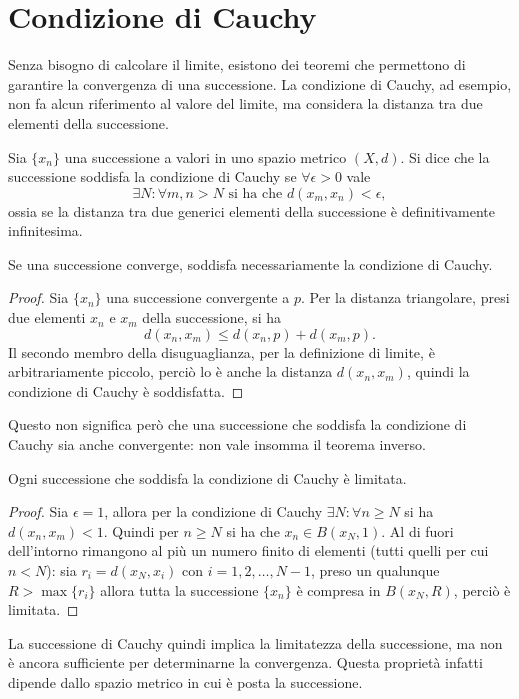 \section{Condizione di Cauchy}
Senza bisogno di calcolare il limite, esistono dei teoremi che permettono di garantire la convergenza di una successione. La condizione di Cauchy, ad esempio, non fa alcun riferimento al valore del limite, ma considera la distanza tra due elementi della successione.
\begin{definizione}
\label{d:ccauchy_successioni}
Sia $\{x_n\}$ una successione a valori in uno spazio metrico $(X,d)$. Si dice che la successione soddisfa la condizione di Cauchy se $\forall\epsilon>0$ vale
\begin{equation}
\label{eq:ccauchy_successioni}
\exists N\colon\forall m,n>N\text{ si ha che }d(x_m,x_n)<\epsilon,
\end{equation}
ossia se la distanza tra due generici elementi della successione è definitivamente infinitesima.
\end{definizione}
\begin{osservazione}
Se una successione converge, soddisfa necessariamente la condizione di Cauchy.
\end{osservazione}
\begin{proof}
Sia $\{x_n\}$ una successione convergente a $p$. Per la distanza triangolare, presi due elementi $x_n$ e $x_m$ della successione, si ha
\[
d(x_n,x_m)\leq d(x_n,p)+d(x_m,p).
\]
Il secondo membro della disuguaglianza, per la definizione di limite, è arbitrariamente piccolo, perciò lo è anche la distanza $d(x_n,x_m)$, quindi la condizione di Cauchy è soddisfatta.
\end{proof}
Questo non significa però che una successione che soddisfa la condizione di Cauchy sia anche convergente: non vale insomma il teorema inverso.
\begin{osservazione}
Ogni successione che soddisfa la condizione di Cauchy è limitata.
\end{osservazione}
\begin{proof}
Sia $\epsilon=1$, allora per la condizione di Cauchy $\exists N\colon\forall n\geq N$ si ha $d(x_n,x_m)<1$. Quindi per $n\geq N$ si ha che $x_n\in B(x_N,1)$. Al di fuori dell'intorno rimangono al più un numero finito di elementi (tutti quelli per cui $n<N$): sia $r_i=d(x_N,x_i)$ con $i=1,2,\dots,N-1$, preso un qualunque $R>\max\{r_i\}$ allora tutta la successione $\{x_n\}$ è compresa in $B(x_N,R)$, perciò è limitata.
\end{proof}
La successione di Cauchy quindi implica la limitatezza della successione, ma non è ancora sufficiente per determinarne la convergenza. Questa proprietà infatti dipende dallo spazio metrico in cui è posta la successione.
